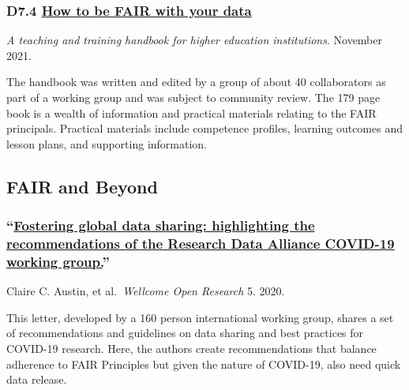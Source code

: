 \documentclass[
]{book}
\begin{document}
\hypertarget{d7.4-how-to-be-fair-with-your-data}{%
\subsubsection*{\texorpdfstring{D7.4 \href{https://zenodo.org/record/5837500\#.Yhk8L5PMJ6e}{How to be FAIR with your data}}{D7.4 How to be FAIR with your data}}\label{d7.4-how-to-be-fair-with-your-data}}

\emph{A teaching and training handbook for higher education institutions}. November 2021.

The handbook was written and edited by a group of about 40 collaborators as part of a working group and was subject to community review. The 179 page book is a wealth of information and practical materials relating to the FAIR principals. Practical materials include competence profiles, learning outcomes and lesson plans, and supporting information.

\hypertarget{fair-and-beyond}{%
\subsection{FAIR and Beyond}\label{fair-and-beyond}}

\hypertarget{fostering-global-data-sharing-highlighting-the-recommendations-of-the-research-data-alliance-covid-19-working-group.}{%
\subsubsection*{\texorpdfstring{``\href{https://www.ncbi.nlm.nih.gov/pmc/articles/PMC7808050/}{Fostering global data sharing: highlighting the recommendations of the Research Data Alliance COVID-19 working group.}''}{``Fostering global data sharing: highlighting the recommendations of the Research Data Alliance COVID-19 working group.''}}\label{fostering-global-data-sharing-highlighting-the-recommendations-of-the-research-data-alliance-covid-19-working-group.}}

Claire C. Austin, et al.~\emph{Wellcome Open Research} 5. 2020.

This letter, developed by a 160 person international working group, shares a set of recommendations and guidelines on data sharing and best practices for COVID-19 research. Here, the authors create recommendations that balance adherence to FAIR Principles but given the nature of COVID-19, also need quick data release.
\end{document}
